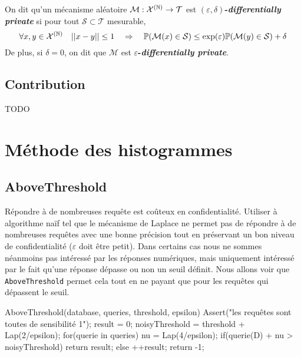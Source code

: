 
On dit qu'un mécanisme aléatoire \(\mathcal M :\mathcal X^{(\mathbb{N})} \to \mathcal T\) est \textbf{\((\varepsilon, \delta)\)-\textit{differentially private}} si pour tout \(\mathcal S \subset \mathcal T \) mesurable, 
\[
    \forall x,y \in \mathcal X^{(\mathbb{N})} \quad ||x - y|| \leq 1 \quad \Rightarrow \quad \mathbb P(\mathcal M(x) \in \mathcal S) \leq \exp(\varepsilon)  \mathbb P(\mathcal M(y) \in \mathcal S) + \delta
\] 
De plus, si \(\delta = 0\), on dit que \(\mathcal M\) est \textbf{\(\varepsilon\)-\textit{differentially private}}.\\


\subsection{Contribution}

TODO

\section{Méthode des histogrammes}

\subsection{AboveThreshold}

Répondre à de nombreuses requête est coûteux en confidentialité. Utiliser à algorithme naïf tel que le mécanisme de {\sc Laplace} ne permet pas de répondre à de nombreuses requêtes avec une bonne précision tout en préservant un bon niveau de confidentialité (\(\varepsilon\) doit être petit). Dans certains cas nous ne sommes néanmoins pas intéressé par les réponses numériques, mais uniquement intéressé par le fait qu'une réponse dépasse ou non un seuil définit. Nous allons voir que \texttt{AboveThreshold} permet cela tout en ne payant que pour les requêtes qui dépassent le seuil.

\label{AboveThreshold}
\begin{code}
    AboveThreshold(database, queries, threshold, epsilon){
        Assert("les requêtes sont toutes de sensibilité 1");
        result = 0;
        noisyThreshold = threshold + Lap(2/epsilon);
        for(querie in queries){
            nu = Lap(4/epsilon);
            if(querie(D) + nu > noisyThreshold)
                return result;
            else
                ++result;
        }
        return -1;
    }
\end{code}

